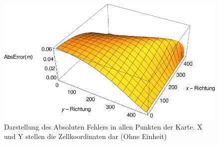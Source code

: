 \begin{figure}
\begin{minipage}{.8\textwidth}
\end{minipage}
\\
\begin{minipage}{.8\textwidth}
\centering
  \includegraphics[width=1\linewidth]{abbildungen/vergleich_euklid_fast_marching/3DVergleich/cellsize0_03125/Error.pdf}
\end{minipage}
\caption{Darstellung des Absoluten Fehlers in allen Punkten der Karte. X und Y stellen die Zellkoordinaten dar (Ohne Einheit)}
\label{fig_error_3d_aufstellung}
\end{figure}





